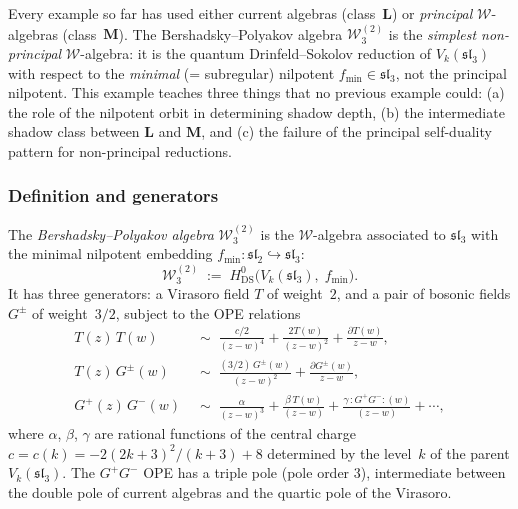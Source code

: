 Every example so far has used either current algebras (class~$\mathbf{L}$)
or \emph{principal} $\mathcal{W}$-algebras (class~$\mathbf{M}$). The
Bershadsky--Polyakov algebra $\mathcal{W}_3^{(2)}$ is the
\emph{simplest non-principal} $\mathcal{W}$-algebra: it is the quantum
Drinfeld--Sokolov reduction of $V_k(\mathfrak{sl}_3)$ with respect to the
\emph{minimal} (= subregular) nilpotent $f_{\min} \in \mathfrak{sl}_3$,
not the principal nilpotent. This example teaches three things that
no previous example could: (a) the role of the nilpotent orbit in
determining shadow depth, (b) the intermediate shadow class between
$\mathbf{L}$ and $\mathbf{M}$, and (c) the failure of the principal
self-duality pattern for non-principal reductions.

\subsubsection{Definition and generators}

\begin{definition}
\label{def:bershadsky-polyakov}
The \emph{Bershadsky--Polyakov algebra}
$\mathcal{W}_3^{(2)}$ is the $\mathcal{W}$-algebra associated to
$\mathfrak{sl}_3$ with the minimal nilpotent embedding
$f_{\min}\colon \mathfrak{sl}_2 \hookrightarrow \mathfrak{sl}_3$:
\[
 \mathcal{W}_3^{(2)}
 \;:=\;
 H^0_{\mathrm{DS}}\bigl(V_k(\mathfrak{sl}_3),\; f_{\min}\bigr).
\]
It has three generators: a Virasoro field $T$ of weight~$2$,
and a pair of bosonic fields $G^\pm$ of weight~$3/2$, subject
to the OPE relations
\begin{align}
 T(z)\,T(w) &\;\sim\; \frac{c/2}{(z-w)^4}
 + \frac{2T(w)}{(z-w)^2} + \frac{\partial T(w)}{z-w},
 \label{eq:BP-TT} \\
 T(z)\,G^\pm(w) &\;\sim\; \frac{(3/2)\,G^\pm(w)}{(z-w)^2}
 + \frac{\partial G^\pm(w)}{z-w},
 \label{eq:BP-TG} \\
 G^+(z)\,G^-(w) &\;\sim\;
 \frac{\alpha}{(z-w)^3}
 + \frac{\beta\, T(w)}{(z-w)}
 + \frac{\gamma\, {:}G^+G^-{:}(w)}{(z-w)}
 + \cdots, \label{eq:BP-GG}
\end{align}
where $\alpha$, $\beta$, $\gamma$ are rational functions of the
central charge
$c = c(k) = -2(2k+3)^2/(k+3) + 8$ determined by the level~$k$ of the
parent $V_k(\mathfrak{sl}_3)$.
The $G^+G^-$ OPE has a triple pole
\textup{(}pole order $3$\textup{)}, intermediate between the
double pole of current algebras and the quartic pole of the Virasoro.
\end{definition}

